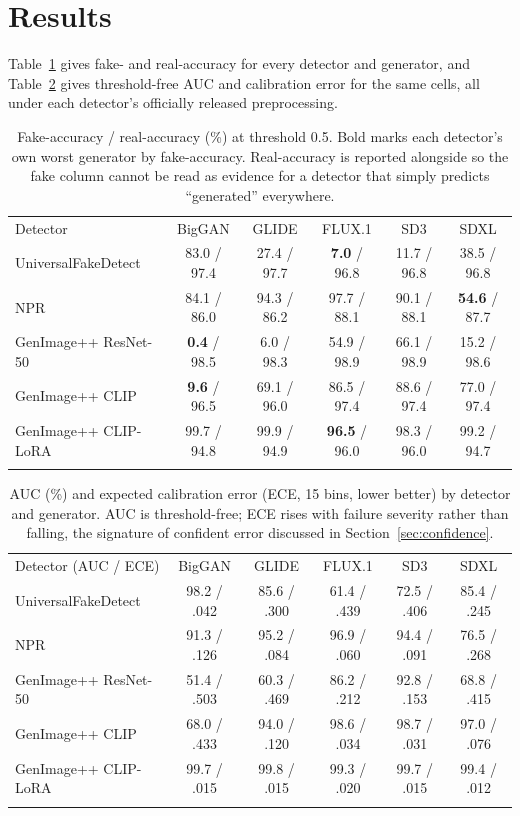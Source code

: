 \documentclass[3p,times,procedia]{elsarticle}
\begin{document}
\section{Results}
\label{sec:results}

Table~\ref{tab:results} gives fake- and real-accuracy for every detector
and generator, and Table~\ref{tab:auc} gives threshold-free AUC and
calibration error for the same cells, all under each detector's officially
released preprocessing.

\begin{table}[h]
\caption{Fake-accuracy / real-accuracy (\%) at threshold 0.5. Bold marks
each detector's own worst generator by fake-accuracy. Real-accuracy is
reported alongside so the fake column cannot be read as evidence for a
detector that simply predicts ``generated'' everywhere.}
\label{tab:results}
\begin{tabular*}{\hsize}{@{\extracolsep{\fill}}lccccc@{}}
\toprule
Detector & BigGAN & GLIDE & FLUX.1 & SD3 & SDXL \\
\colrule
UniversalFakeDetect & 83.0 / 97.4 & 27.4 / 97.7 & \textbf{7.0} / 96.8 & 11.7 / 96.8 & 38.5 / 96.8 \\
NPR & 84.1 / 86.0 & 94.3 / 86.2 & 97.7 / 88.1 & 90.1 / 88.1 & \textbf{54.6} / 87.7 \\
GenImage++ ResNet-50 & \textbf{0.4} / 98.5 & 6.0 / 98.3 & 54.9 / 98.9 & 66.1 / 98.9 & 15.2 / 98.6 \\
GenImage++ CLIP & \textbf{9.6} / 96.5 & 69.1 / 96.0 & 86.5 / 97.4 & 88.6 / 97.4 & 77.0 / 97.4 \\
GenImage++ CLIP-LoRA & 99.7 / 94.8 & 99.9 / 94.9 & \textbf{96.5} / 96.0 & 98.3 / 96.0 & 99.2 / 94.7 \\
\botrule
\end{tabular*}
\end{table}

\begin{table}[h]
\caption{AUC (\%) and expected calibration error (ECE, 15 bins, lower
better) by detector and generator. AUC is threshold-free; ECE rises with
failure severity rather than falling, the signature of confident error
discussed in Section~\ref{sec:confidence}.}
\label{tab:auc}
\begin{tabular*}{\hsize}{@{\extracolsep{\fill}}lccccc@{}}
\toprule
Detector (AUC / ECE) & BigGAN & GLIDE & FLUX.1 & SD3 & SDXL \\
\colrule
UniversalFakeDetect & 98.2 / .042 & 85.6 / .300 & 61.4 / .439 & 72.5 / .406 & 85.4 / .245 \\
NPR & 91.3 / .126 & 95.2 / .084 & 96.9 / .060 & 94.4 / .091 & 76.5 / .268 \\
GenImage++ ResNet-50 & 51.4 / .503 & 60.3 / .469 & 86.2 / .212 & 92.8 / .153 & 68.8 / .415 \\
GenImage++ CLIP & 68.0 / .433 & 94.0 / .120 & 98.6 / .034 & 98.7 / .031 & 97.0 / .076 \\
GenImage++ CLIP-LoRA & 99.7 / .015 & 99.8 / .015 & 99.3 / .020 & 99.7 / .015 & 99.4 / .012 \\
\botrule
\end{tabular*}
\end{table}
\end{document}
